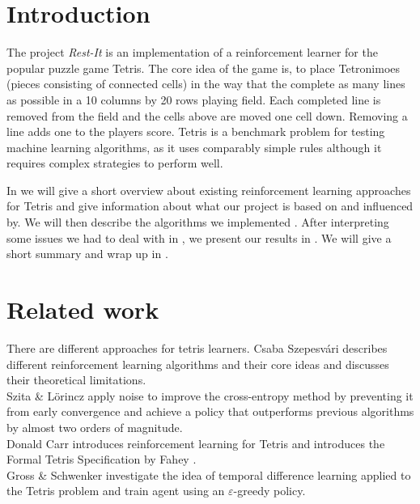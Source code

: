 \documentclass{ml}
\begin{document}


\section{Introduction}
\label{intro}
The project \textit{Rest-It} is an implementation of a reinforcement learner for the popular puzzle game Tetris. 
The core idea of the game is, to place Tetronimoes (pieces consisting of connected cells) in the way that the complete as many lines as possible in a 10 columns by 20 rows playing field.
Each completed line is removed from the field and the cells above are moved one cell down.
Removing a line adds one to the players score.
Tetris is a benchmark problem for testing machine learning algorithms, as it uses comparably simple rules although it requires complex strategies to perform well. 

In  we will give a short overview about existing reinforcement learning approaches for Tetris and give information about what our project is based on and influenced by.
We will then describe the algorithms we implemented .
After interpreting some issues we had to deal with in , we present our results in .
We will give a short summary and wrap up in .


\section{Related work}
\label{relatedwork}
There are different approaches for tetris learners. 
Csaba Szepesvári \cite{szepesvari2010algorithms} describes different reinforcement learning algorithms and their core ideas and discusses their theoretical  limitations. \\
Szita \&  L{\"o}rincz \cite{szita2006learning} apply noise to improve the cross-entropy method by preventing it from early convergence and achieve a policy that outperforms previous algorithms by almost two orders of magnitude.\\
Donald Carr introduces reinforcement learning for Tetris and introduces the Formal Tetris Specification by Fahey \cite{faheytetris}.\\
Gross \& Schwenker \cite{gross2008learningto} investigate the idea of temporal difference learning applied to the Tetris problem and train agent using an $\varepsilon$-greedy policy. 
\end{document}
